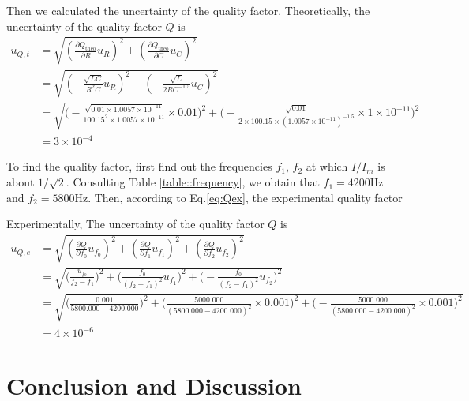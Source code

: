 \documentclass[a4paper]{article}
\begin{document}
Then we calculated the uncertainty of the quality factor. Theoretically, the uncertainty of the quality factor $Q$ is
\begin{align*}
	u_{Q,t}
	 & = \sqrt{(\frac{\partial Q_{\text{theo}}}{\partial R}u_R)^2 + (\frac{\partial Q_{\text{theo}}}{\partial C}u_C)^2}                                                                                                                        \\
	 & = \sqrt{(-\frac{\sqrt{LC}}{R^2C}u_R)^2 + (-\frac{\sqrt{L}}{2RC^{-1.5}} u_C)^2}                                                                                                                                                          \\
	 & = \sqrt{\bigg(-\frac{\sqrt{0.01\times 1.0057\times 10^{-11}}}{100.15^2\times 1.0057\times 10^{-11}}\times 0.01\bigg)^2 + \bigg(-\frac{\sqrt{0.01}}{2\times 100.15\times(1.0057\times 10^{-11})^{-1.5}}\times 1 \times 10^{-11}\bigg)^2} \\
	 & = 3\times 10^{-4}
\end{align*}

To find the quality factor, first find out the frequencies $f_1$, $f_2$ at which $I/I_m$ is about $1/\sqrt{2}$. Consulting Table \ref{table::frequency}, we obtain that $f_1 = 4200 \text{Hz}$ and $f_2 = 5800 \text{Hz}$. Then, according to Eq.\eqref{eq:Qex}, the experimental quality factor

Experimentally, The uncertainty of the quality factor $Q$ is
\begin{align*}
	u_{Q,e}
	 & = \sqrt{(\frac{\partial Q}{\partial f_0}u_{f_0})^2 + (\frac{\partial Q}{\partial f_1}u_{f_1})^2 + (\frac{\partial Q}{\partial f_2}u_{f_2})^2}                                                \\
	 & = \sqrt{\bigg(\frac{u_{f_0}}{f_2-f_1}\bigg)^2 + \bigg(\frac{f_0}{(f_2-f_1)^2}u_{f_1}\bigg)^2 + \bigg(-\frac{f_0}{(f_2-f_1)^2}u_{f_2}\bigg)^2}                                                \\
	 & = \sqrt{\bigg(\frac{0.001}{5800.000-4200.000}\bigg)^2 + \bigg(\frac{5000.000}{(5800.000-4200.000)^2}\times0.001\bigg)^2  + \bigg(-\frac{5000.000}{(5800.000-4200.000)^2}\times0.001\bigg)^2} \\
	 & = 4 \times 10^{-6}
\end{align*}


\section{Conclusion and Discussion}
\end{document}
